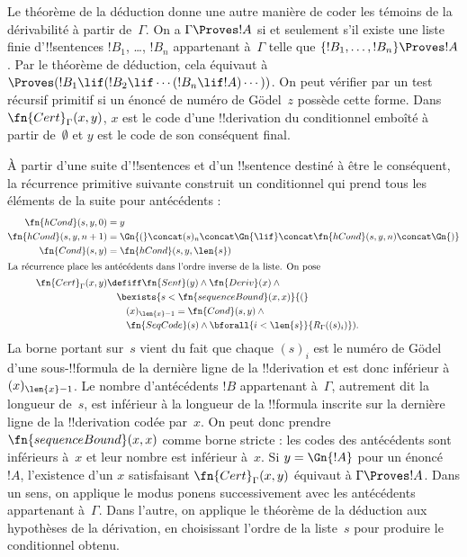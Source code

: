 \documentclass[../../../include/open-logic-section]{subfiles}
\begin{document}
\begin{explain}
Le théorème de la déduction donne une autre manière de coder
les témoins de la dérivabilité à partir de~$\Gamma$. On a
$\Gamma \Proves !A$ si et seulement s'il existe une liste finie
d'!!{sentence}s $!B_1$, \dots, $!B_n$ appartenant à~$\Gamma$
telle que $\{!B_1, \dots, !B_n\} \Proves !A$. Par le théorème de
déduction, cela équivaut à
$\Proves (!B_1 \lif (!B_2 \lif \cdots (!B_n \lif !A)\cdots))$.
On peut vérifier par un test récursif primitif si un énoncé de
numéro de G\"odel~$z$ possède cette forme. Dans
$\fn{Cert}_{\Gamma}(x,y)$, $x$ est le code d'une !!{derivation}
du conditionnel emboîté à partir de~$\emptyset$ et $y$ est
le code de son conséquent final.

À partir d'une suite d'!!{sentence}s et d'un !!{sentence} destiné
à être le conséquent, la récurrence primitive suivante construit
un conditionnel qui prend tous les éléments de la suite pour
antécédents :
\begin{align*}
  \fn{hCond}(s, y, 0) & = y \\
  \fn{hCond}(s, y, n+1) & = \Gn{(} \concat (s)_{n} \concat \Gn{\lif}
  \concat \fn{hCond}(s, y, n) \concat \Gn{)}\\
  \fn{Cond}(s, y) & = \fn{hCond}(s, y, \len{s})\\
  \intertext{La récurrence place les antécédents dans l'ordre inverse de la liste. On pose}
  \fn{Cert}_{\Gamma}(x,y) & \defiff \fn{Sent}(y)\land\fn{Deriv}(x)\land{} \\
  &\quad\bexists{s < \fn{sequenceBound}(x,x)}{(} \\
  &\qquad (x)_{\len{x}-1} = \fn{Cond}(s,y) \land {} \\
  &\qquad\fn{SeqCode}(s)\land\bforall{i<\len{s}}{R_\Gamma((s)_i)}).
\end{align*}
La borne portant sur~$s$ vient du fait que chaque $(s)_i$ est le
numéro de G\"odel d'une sous-!!{formula} de la dernière ligne de
la !!{derivation} et est donc inférieur à $(x)_{\len{x}-1}$.
Le nombre d'antécédents $!B$ appartenant à~$\Gamma$, autrement
dit la longueur de~$s$, est inférieur à la longueur de la
!!{formula} inscrite sur la dernière ligne de la !!{derivation}
codée par~$x$. On peut donc prendre $\fn{sequenceBound}(x,x)$
comme borne stricte : les codes des antécédents sont inférieurs
à~$x$ et leur nombre est inférieur à~$x$.
Si $y=\Gn{!A}$ pour un énoncé~$!A$, l'existence d'un
$x$ satisfaisant $\fn{Cert}_{\Gamma}(x,y)$ équivaut à
$\Gamma \Proves !A$. Dans un sens, on applique le modus ponens
successivement avec les antécédents appartenant à~$\Gamma$.
Dans l'autre, on applique le théorème de la déduction aux
hypothèses de la dérivation, en choisissant l'ordre de la liste~$s$
pour produire le conditionnel obtenu.
\end{explain}
\end{document}
